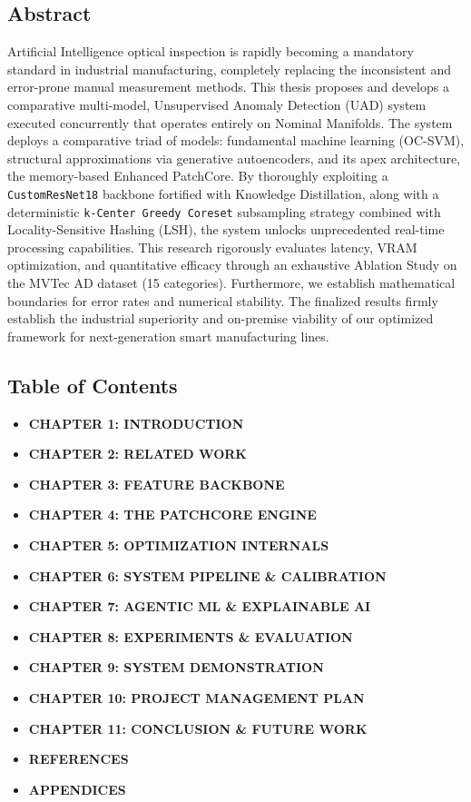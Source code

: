 \subsection{Abstract}\label{abstract}

Artificial Intelligence optical inspection is rapidly becoming a mandatory standard in industrial manufacturing, completely replacing the inconsistent and error-prone manual measurement methods. This thesis proposes and develops a comparative multi-model, Unsupervised Anomaly Detection (UAD) system executed concurrently that operates entirely on Nominal Manifolds. The system deploys a comparative triad of models: fundamental machine learning (OC-SVM), structural approximations via generative autoencoders, and its apex architecture, the memory-based Enhanced PatchCore. By thoroughly exploiting a \texttt{CustomResNet18} backbone fortified with Knowledge Distillation, along with a deterministic \texttt{k-Center\ Greedy\ Coreset} subsampling strategy combined with Locality-Sensitive Hashing (LSH), the system unlocks unprecedented real-time processing capabilities. This research rigorously evaluates latency, VRAM optimization, and quantitative efficacy through an exhaustive Ablation Study on the MVTec AD dataset (15 categories). Furthermore, we establish mathematical boundaries for error rates and numerical stability. The finalized results firmly establish the industrial superiority and on-premise viability of our optimized framework for next-generation smart manufacturing lines.

\subsection{Table of Contents}\label{table-of-contents}

\begin{itemize}
\tightlist
\item
  \textbf{CHAPTER 1: INTRODUCTION}
\item
  \textbf{CHAPTER 2: RELATED WORK}
\item
  \textbf{CHAPTER 3: FEATURE BACKBONE}
\item
  \textbf{CHAPTER 4: THE PATCHCORE ENGINE}
\item
  \textbf{CHAPTER 5: OPTIMIZATION INTERNALS}
\item
  \textbf{CHAPTER 6: SYSTEM PIPELINE \& CALIBRATION}
\item
  \textbf{CHAPTER 7: AGENTIC ML \& EXPLAINABLE AI}
\item
  \textbf{CHAPTER 8: EXPERIMENTS \& EVALUATION}
\item
  \textbf{CHAPTER 9: SYSTEM DEMONSTRATION}
\item
  \textbf{CHAPTER 10: PROJECT MANAGEMENT PLAN}
\item
  \textbf{CHAPTER 11: CONCLUSION \& FUTURE WORK}
\item
  \textbf{REFERENCES}
\item
  \textbf{APPENDICES}
\end{itemize}

